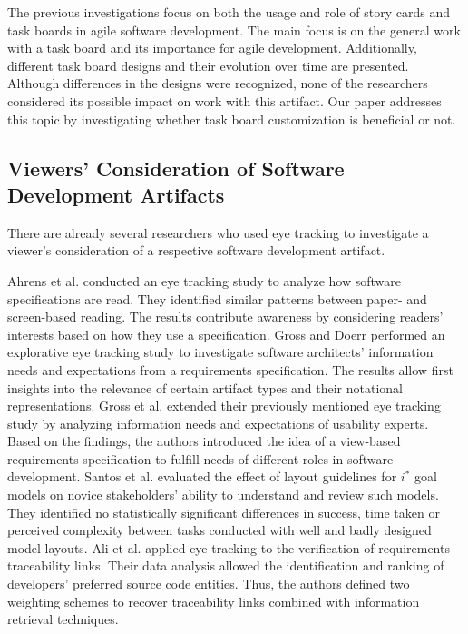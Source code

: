 \documentclass{llncs}
\begin{document}
The previous investigations focus on both the usage and role of story cards and 
task boards in agile software development. The main focus is on the general 
work with a task board and its importance for agile development. Additionally, 
different task board designs and their evolution over time are presented. 
Although differences in the designs were recognized, none of the researchers 
considered its possible impact on work with this artifact. Our paper addresses 
this topic by investigating whether task board customization is beneficial or 
not.

\subsection{Viewers' Consideration of Software Development Artifacts}
There are already several researchers who used eye tracking to investigate a viewer's consideration of a respective software development artifact.

Ahrens et al. \cite{Ahrens.2016} conducted an eye tracking study to analyze how software specifications are read. They identified similar patterns between paper- and screen-based reading. The results contribute awareness by considering readers' interests based on how they use a specification.
Gross and Doerr \cite{Gross.2012} performed an explorative eye tracking study 
to investigate software architects' information needs and expectations from a 
requirements specification. The results allow first insights into the relevance 
of certain artifact types and their notational representations.
Gross et al. \cite{Gross.2012b} extended their previously mentioned eye 
tracking study by analyzing information needs and expectations of usability 
experts. Based on the findings, the authors introduced the idea of a view-based 
requirements specification to fulfill needs of different roles in software 
development.
Santos et al. \cite{Santos.2016} evaluated the effect of layout guidelines for $i^{*}$ goal models on novice stakeholders' ability to understand and review such models. They identified no statistically significant differences in success, time taken or perceived complexity between tasks conducted with well and badly designed model layouts.
Ali et al. \cite{Ali.2012} applied eye tracking to the verification of 
requirements traceability links. Their data analysis allowed the identification 
and ranking of developers' preferred source code entities. Thus, the authors 
defined two weighting schemes to recover traceability links combined with 
information retrieval techniques.
\end{document}
